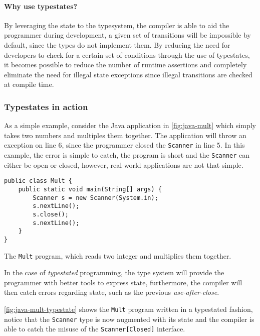 \paragraph{Why use typestates?}
By leveraging the state to the typesystem, the compiler is able to aid the programmer during development,
a given set of transitions will be impossible by default, since the types do not implement them. %
By reducing the need for developers to check for a certain set of conditions through the use of typestates,
it becomes possible to reduce the number of runtime assertions and
completely eliminate the need for illegal state exceptions since illegal transitions are checked at compile time.


\subsubsection*{Typestates in action}

As a simple example, consider the Java application in \autoref{fig:java-mult} which simply takes two numbers and multiples them together.
The application will throw an exception on line 6,
since the programmer closed the \texttt{Scanner} in line 5.
In this example, the error is simple to catch,
the program is short and the \texttt{Scanner} can either be open or closed,
however, real-world applications are not that simple.

\begin{listing}
    \centering
    \begin{verbatim}
public class Mult {
    public static void main(String[] args) {
        Scanner s = new Scanner(System.in);
        s.nextLine();
        s.close();
        s.nextLine();
    }
}
    \end{verbatim}
    \caption{The \texttt{Mult} program, which reads two integer and multiplies them together.}
    \label{fig:java-mult}
\end{listing}

In the case of \emph{typestated} programming,
the type system will provide the programmer with better tools to express state,
furthermore, the compiler will then catch errors regarding state,
such as the previous \emph{use-after-close}.

\autoref{fig:java-mult-typestate} shows the \texttt{Mult} program written in a typestated fashion,
notice that the \texttt{Scanner} type is now augmented with its state and
the compiler is able to catch the misuse of the \texttt{Scanner[Closed]} interface.


